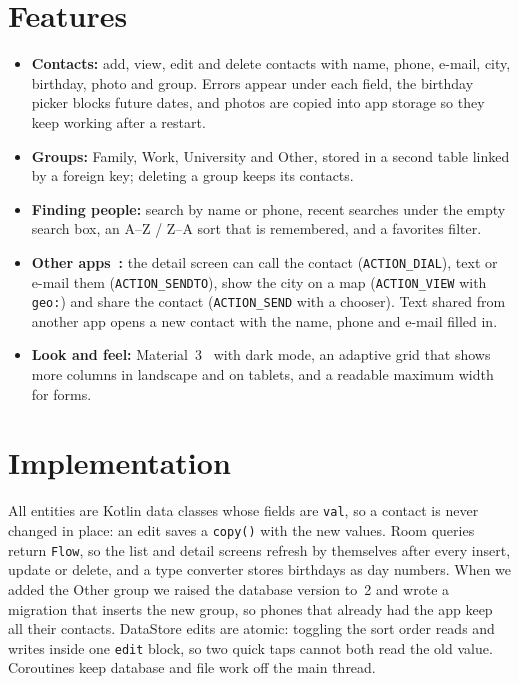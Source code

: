 \documentclass[sigconf,nonacm]{acmart}
\begin{document}
\section{Features}
\begin{itemize}
  \item \textbf{Contacts:} add, view, edit and delete contacts with name, phone, e-mail, city,
    birthday, photo and group. Errors appear under each field, the birthday picker blocks future
    dates, and photos are copied into app storage so they keep working after a restart.
  \item \textbf{Groups:} Family, Work, University and Other, stored in a second table linked by a
    foreign key; deleting a group keeps its contacts.
  \item \textbf{Finding people:} search by name or phone, recent searches under the empty search
    box, an A--Z / Z--A sort that is remembered, and a favorites filter.
  \item \textbf{Other apps~\cite{intents}:} the detail screen can call the contact
    (\texttt{ACTION\_DIAL}), text or e-mail them (\texttt{ACTION\_SENDTO}), show the city on
    a map (\texttt{ACTION\_VIEW} with \texttt{geo:}) and share the contact (\texttt{ACTION\_SEND}
    with a chooser). Text shared from another app opens a new contact with the name, phone and
    e-mail filled in.
  \item \textbf{Look and feel:} Material~3~\cite{material} with dark mode, an adaptive grid that
    shows more columns in landscape and on tablets, and a readable maximum width for forms.
\end{itemize}

\section{Implementation}
All entities are Kotlin data classes whose fields are \texttt{val}, so a contact is never changed
in place: an edit saves a \texttt{copy()} with the new values. Room queries return \texttt{Flow},
so the list and detail screens refresh by themselves after every insert, update or delete, and a
type converter stores birthdays as day numbers. When we added the Other group we raised the
database version to~2 and wrote a migration that inserts the new group, so phones that already
had the app keep all their contacts. DataStore edits are atomic: toggling the sort order reads and
writes inside one \texttt{edit} block, so two quick taps cannot both read the old value.
Coroutines keep database and file work off the main thread.
\end{document}
